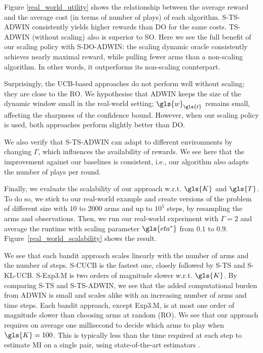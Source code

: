 Figure \ref{real_world_utility} shows the relationship between the average reward and the average cost (in terms of number of plays) of each algorithm. 
\gls{S-TS-ADWIN} consistently yields higher rewards than \gls{DO} for the same costs. 
\gls{TS}-\gls{ADWIN} (without scaling) also is superior to \gls{SO}. Here we see the full benefit of our scaling policy with S-\gls{DO}-\gls{ADWIN}: 
the scaling dynamic oracle consistently achieves nearly maximal reward, while pulling fewer arms than a non-scaling algorithm. In other words, it outperforms its non-scaling counterpart. 

Surprisingly, the \gls{UCB}-based approaches do not perform well without scaling; they are close to the \acrfull{RO}. We hypothesise that \gls{ADWIN} keeps the size of the dynamic window small in the real-world setting; $\gls{w}_{\gls{t}}$ remains small, affecting the sharpness of the confidence bound. However, when our scaling policy is used, both approaches perform slightly better than \gls{DO}. 

We also verify that \gls{S-TS-ADWIN} can adapt to different environments by changing $\Gamma$, which influences the availability of rewards. 
We see here that the improvement against our baselines is consistent, i.e., our algorithm also adapts the number of plays per round. 

Finally, we evaluate the scalability of our approach w.r.t. $\gls{K}$ and $\gls{T}$. 
To do so, we stick to our real-world example and create versions of the problem of different size with $10$ to $2000$ arms and up to $10^5$ steps, by resampling the arms and observations. Then, we run our real-world experiment with $\Gamma = 2$ and average the runtime with scaling parameter $\gls{eta^*}$ from $0.1$ to $0.9$. Figure~\ref{real_world_scalability} shows the result. 

We see that each bandit approach scales linearly with the number of arms and the number of steps. S-\gls{CUCB} is the fastest one, closely followed by \gls{S-TS} and \gls{S-KL-UCB}. 
S-\gls{Exp3.M} is two orders of magnitude slower w.r.t. $\gls{K}$. 
By comparing \gls{S-TS} and \gls{S-TS-ADWIN}, we see that the added computational burden from \gls{ADWIN} is small and scales alike with an increasing number of arms and time steps.
Each bandit approach, except \gls{Exp3.M}, is at most one order of magnitude slower than choosing arms at random (\gls{RO}). We see that our approach requires on average one millisecond to decide which arms to play when $\gls{K}=100$.
This is typically less than the time required at each step to estimate \gls{MI} on a single pair, using state-of-the-art estimators \cite{kraskov2004estimating}.

